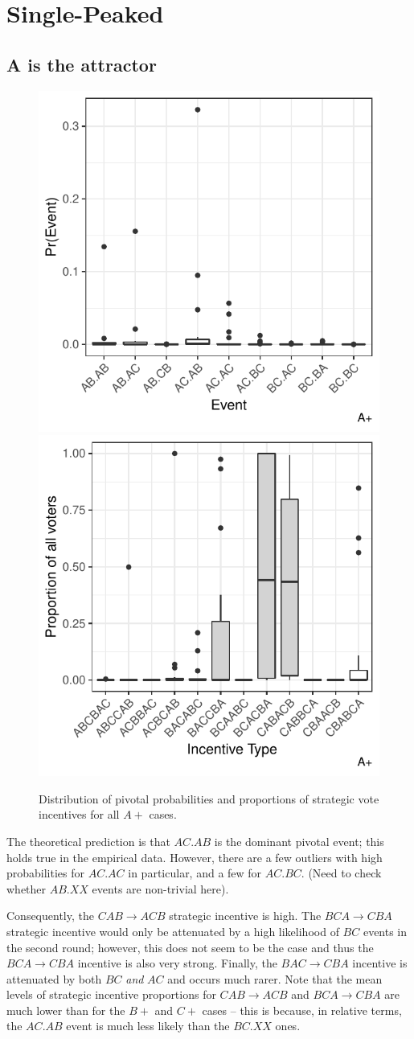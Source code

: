 \documentclass[11pt, letter, margin = 2 in]{article}
\begin{document}
\section{Single-Peaked}

\subsection{A is the attractor}

\begin{figure}[!htb]
	\centering
	\includegraphics[width = .45\textwidth]{../output/figures/prediction/pprob_sp_a.pdf}
	\includegraphics[width = .45\textwidth]{../output/figures/prediction/svinc_sp_a.pdf}
	\caption{Distribution of pivotal probabilities and proportions of strategic vote incentives for all $A+$ cases.}
	\label{fig:figure1}
\end{figure}

The theoretical prediction is that $AC.AB$ is the dominant pivotal event; this holds true in the empirical data. However, there are a few outliers with high probabilities for $AC.AC$ in particular, and a few for $AC.BC$. (Need to check whether $AB.XX$ events are non-trivial here). 

Consequently, the $CAB \rightarrow ACB$ strategic incentive is high. The $BCA \rightarrow CBA$ strategic incentive would only be attenuated by a high likelihood of $BC$ events in the second round; however, this does not seem to be the case and thus the $BCA \rightarrow CBA$ incentive is also very strong. Finally, the $BAC \rightarrow CBA$ incentive is attenuated by both $BC$ \textit{and} $AC$ and occurs much rarer. Note that the mean levels of strategic incentive proportions for $CAB \rightarrow ACB$ and $BCA \rightarrow CBA$ are much lower than for the $B+$ and $C+$ cases -- this is because, in relative terms, the $AC.AB$ event is much less likely than the $BC.XX$ ones.
\end{document}
